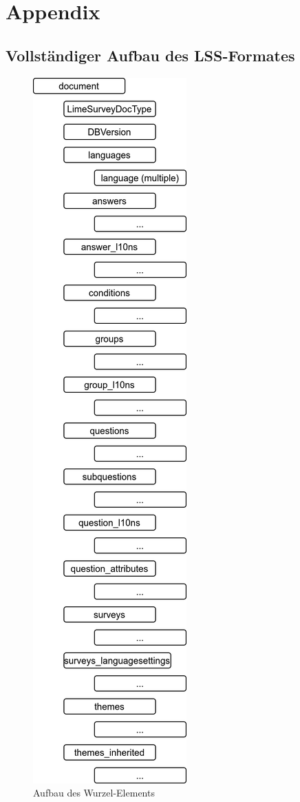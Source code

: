 \appendix

\chapter{Appendix}
\section{Vollständiger Aufbau des LSS-Formates}

\begin{figure}[h]
			\centering
			\includegraphics[width=.25\textwidth]{./img/append_lss.png}
			\caption{Aufbau des Wurzel-Elements }
\end{figure}

